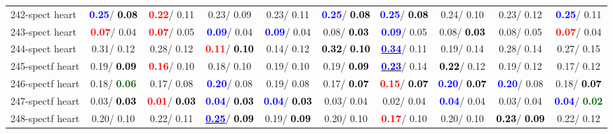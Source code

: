 \begin{table}[h]
\begin{center}
{\begin{tabular}{lc|c|c|c|c|c|c|c|c}
242-spect heart & \textcolor{blue}{\textbf{  0.25}}/\textcolor{black}{\textbf{  0.08}} & \textcolor{red}{\textbf{  0.22}}/  0.11 &   0.23/  0.09 &   0.23/  0.11 & \textcolor{blue}{\textbf{  0.25}}/\textcolor{black}{\textbf{  0.08}} & \textcolor{blue}{\textbf{  0.25}}/\textcolor{black}{\textbf{  0.08}} &   0.24/  0.10 &   0.23/  0.12 & \textcolor{blue}{\textbf{  0.25}}/  0.11 \\
243-spect heart & \textcolor{red}{\textbf{  0.07}}/  0.04 & \textcolor{red}{\textbf{  0.07}}/  0.05 & \textcolor{blue}{\textbf{  0.09}}/  0.04 & \textcolor{blue}{\textbf{  0.09}}/  0.04 &   0.08/\textcolor{black}{\textbf{  0.03}} & \textcolor{blue}{\textbf{  0.09}}/  0.05 &   0.08/\textcolor{black}{\textbf{  0.03}} &   0.08/  0.05 & \textcolor{red}{\textbf{  0.07}}/  0.04 \\
244-spect heart &   0.31/  0.12 &   0.28/  0.12 & \textcolor{red}{\textbf{  0.11}}/\textcolor{black}{\textbf{  0.10}} &   0.14/  0.12 & \textcolor{black}{\textbf{  0.32}}/\textcolor{black}{\textbf{  0.10}} & \underline{\textcolor{blue}{\textbf{  0.34}}}/  0.11 &   0.19/  0.14 &   0.28/  0.14 &   0.27/  0.15 \\
245-spectf heart &   0.19/\textcolor{black}{\textbf{  0.09}} & \textcolor{red}{\textbf{  0.16}}/  0.10 &   0.18/  0.10 &   0.19/  0.10 &   0.19/\textcolor{black}{\textbf{  0.09}} & \underline{\textcolor{blue}{\textbf{  0.23}}}/  0.14 & \textcolor{black}{\textbf{  0.22}}/  0.12 &   0.19/  0.12 &   0.17/  0.12 \\ \hline
246-spectf heart &   0.18/\textcolor{darkgreen}{\textbf{  0.06}} &   0.17/  0.08 & \textcolor{blue}{\textbf{  0.20}}/  0.08 &   0.19/  0.08 &   0.17/\textcolor{black}{\textbf{  0.07}} & \textcolor{red}{\textbf{  0.15}}/\textcolor{black}{\textbf{  0.07}} & \textcolor{blue}{\textbf{  0.20}}/\textcolor{black}{\textbf{  0.07}} & \textcolor{blue}{\textbf{  0.20}}/  0.08 &   0.18/\textcolor{black}{\textbf{  0.07}} \\
247-spectf heart &   0.03/\textcolor{black}{\textbf{  0.03}} & \textcolor{red}{\textbf{  0.01}}/\textcolor{black}{\textbf{  0.03}} & \textcolor{blue}{\textbf{  0.04}}/\textcolor{black}{\textbf{  0.03}} & \textcolor{blue}{\textbf{  0.04}}/\textcolor{black}{\textbf{  0.03}} &   0.03/  0.04 &   0.02/  0.04 & \textcolor{blue}{\textbf{  0.04}}/  0.04 &   0.03/  0.04 & \textcolor{blue}{\textbf{  0.04}}/\textcolor{darkgreen}{\textbf{  0.02}} \\
248-spectf heart &   0.20/  0.10 &   0.22/  0.11 & \underline{\textcolor{blue}{\textbf{  0.25}}}/\textcolor{black}{\textbf{  0.09}} &   0.19/\textcolor{black}{\textbf{  0.09}} &   0.20/  0.10 & \textcolor{red}{\textbf{  0.17}}/  0.10 &   0.20/  0.10 & \textcolor{black}{\textbf{  0.23}}/\textcolor{black}{\textbf{  0.09}} &   0.22/  0.12 \\

\end{tabular}}
\end{center}
\end{table}
